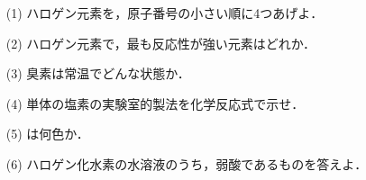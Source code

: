 \documentclass[a4paper,twocolumn,11pt]{ltjsarticle}
\title{}
\author{}
\date{}
\begin{document}
\noindent
\begin{itemize}
    \item [(1)]ハロゲン元素を，原子番号の小さい順に4つあげよ．\\[2cm]
    \item [(2)]ハロゲン元素で，最も反応性が強い元素はどれか．\\[2cm]
    \item [(3)]臭素は常温でどんな状態か．\\[2cm]
    \item [(4)]単体の塩素の実験室的製法を化学反応式で示せ．\\[2cm]
    \item [(5)]は何色か．\\[2cm]
           \item [(6)]ハロゲン化水素の水溶液のうち，弱酸であるものを答えよ．\\[2cm]
\end{itemize}
\newpage
\end{document}
